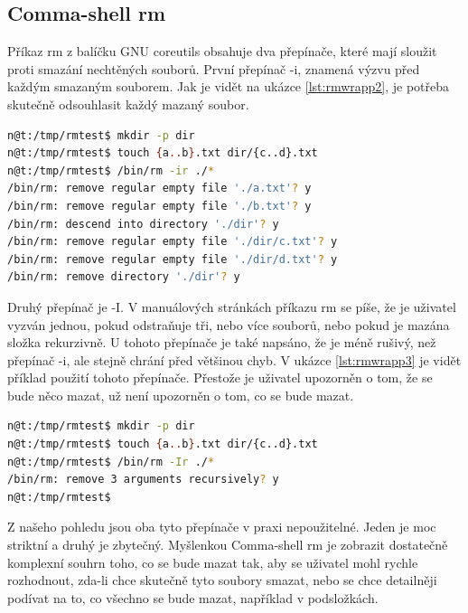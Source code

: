 \documentclass[thesis=M,czech]{FITthesis}[2012/06/26]
\begin{document}
%
\subsection{Comma-shell rm}

Příkaz rm z balíčku GNU coreutils obsahuje dva přepínače, které mají sloužit proti smazání nechtěných souborů. První přepínač -i, znamená výzvu před každým smazaným souborem. Jak je vidět na ukázce \ref{lst:rmwrapp2}, je potřeba skutečně odsouhlasit každý mazaný soubor.

\begin{minipage}{\linewidth}
\begin{lstlisting}[language=bash, caption={rm}, label={lst:rmwrapp2}]
n@t:/tmp/rmtest$ mkdir -p dir
n@t:/tmp/rmtest$ touch {a..b}.txt dir/{c..d}.txt
n@t:/tmp/rmtest$ /bin/rm -ir ./*
/bin/rm: remove regular empty file './a.txt'? y
/bin/rm: remove regular empty file './b.txt'? y
/bin/rm: descend into directory './dir'? y
/bin/rm: remove regular empty file './dir/c.txt'? y
/bin/rm: remove regular empty file './dir/d.txt'? y
/bin/rm: remove directory './dir'? y
\end{lstlisting}
\end{minipage}

Druhý přepínač je -I. V manuálových stránkách příkazu rm se píše, že je uživatel vyzván jednou, pokud odstraňuje tři, nebo více souborů, nebo pokud je mazána složka rekurzivně. U tohoto přepínače je také napsáno, že je méně rušivý, než přepínač -i, ale stejně chrání před většinou chyb. V ukázce \ref{lst:rmwrapp3} je vidět příklad použití tohoto přepínače. Přestože je uživatel upozorněn o tom, že se bude něco mazat, už není upozorněn o tom, co se bude mazat.

\begin{minipage}{\linewidth}
\begin{lstlisting}[language=bash, caption={rm s }, label={lst:rmwrapp3}]
n@t:/tmp/rmtest$ mkdir -p dir
n@t:/tmp/rmtest$ touch {a..b}.txt dir/{c..d}.txt
n@t:/tmp/rmtest$ /bin/rm -Ir ./*
/bin/rm: remove 3 arguments recursively? y
n@t:/tmp/rmtest$ 
\end{lstlisting}
\end{minipage}

Z našeho pohledu jsou oba tyto přepínače v praxi nepoužitelné. Jeden je moc striktní a druhý je zbytečný. Myšlenkou Comma-shell rm je zobrazit dostatečně komplexní souhrn toho, co se bude mazat tak, aby se uživatel mohl rychle rozhodnout, zda-li chce skutečně tyto soubory smazat, nebo se chce detailněji podívat na to, co všechno se bude mazat, například v podsložkách.
\end{document}

